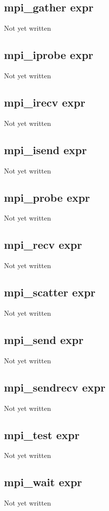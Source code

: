 \documentclass[a4paper,11pt]{article}
\begin{document}
\subsection{\ttfamily mpi\_gather expr}
Not yet written

\subsection{\ttfamily mpi\_iprobe expr}
Not yet written

\subsection{\ttfamily mpi\_irecv expr}
Not yet written

\subsection{\ttfamily mpi\_isend expr}
Not yet written

\subsection{\ttfamily mpi\_probe expr}
Not yet written

\subsection{\ttfamily mpi\_recv expr}
Not yet written

\subsection{\ttfamily mpi\_scatter expr}
Not yet written

\subsection{\ttfamily mpi\_send expr}
Not yet written

\subsection{\ttfamily mpi\_sendrecv expr}
Not yet written

\subsection{\ttfamily mpi\_test expr}
Not yet written

\subsection{\ttfamily mpi\_wait expr}
Not yet written
\end{document}

